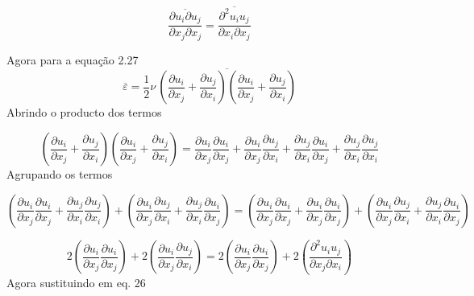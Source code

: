 \documentclass[12pt]{article}
\begin{document}
\begin{equation}
	\frac{\overline{\partial u_i \partial u_j}}{\partial x_j \partial x_j} = \frac{\overline{\partial ^2 u_i u_j}}{\partial x_i \partial x_j}
\end{equation}


Agora para a equação 2.27 
\begin{equation}
	\overline{\varepsilon} = \frac{1}{2} \nu \, \overline{
		\left( \frac{\partial u_i}{\partial x_j} + \frac{\partial u_j}{\partial x_i} \right)
		\left( \frac{\partial u_i}{\partial x_j} + \frac{\partial u_j}{\partial x_i} \right)
	}
\end{equation}
Abrindo o producto dos termos

\begin{equation}
	\left( \frac{\partial u_i}{\partial x_j} + \frac{\partial u_j}{\partial x_i} \right)
	\left( \frac{\partial u_i}{\partial x_j} + \frac{\partial u_j}{\partial x_i} \right) = \frac{\partial u_i}{\partial x_j}\frac{\partial u_i}{\partial x_j} + \frac{\partial u_i}{\partial x_j}\frac{\partial u_j}{\partial x_i} + \frac{\partial u_j}{\partial x_i}\frac{\partial u_i}{\partial x_j} + \frac{\partial u_j}{\partial x_i}\frac{\partial u_j}{\partial x_i}
\end{equation}
 Agrupando os termos
 
\begin{equation}
	 \left( \frac{\partial u_i}{\partial x_j}\frac{\partial u_i}{\partial x_j} +  \frac{\partial u_j}{\partial x_i}\frac{\partial u_j}{\partial x_i} \right) + \left(  \frac{\partial u_i}{\partial x_j}\frac{\partial u_j}{\partial x_i} + \frac{\partial u_j}{\partial x_i}\frac{\partial u_i}{\partial x_j} \right) = 
	 \left( \frac{\partial u_i}{\partial x_j}\frac{\partial u_i}{\partial x_j} +  \frac{\partial u_i}{\partial x_j}\frac{\partial u_i}{\partial x_j} \right) + \left(  \frac{\partial u_i}{\partial x_j}\frac{\partial u_j}{\partial x_i} + \frac{\partial u_j}{\partial x_i}\frac{\partial u_i}{\partial x_j} \right)
\end{equation}

\begin{equation}
	2\left( \frac{\partial u_i}{\partial x_j}\frac{\partial u_i}{\partial x_j}  \right) + 2\left(  \frac{\partial u_i}{\partial x_j}\frac{\partial u_j}{\partial x_i} \right) = 2\left( \frac{\partial u_i}{\partial x_j}\frac{\partial u_i}{\partial x_j}  \right) + 2\left(  \frac{\partial ^2 u_i u_j}{\partial x_j \partial x_i} \right)
\end{equation}
Agora sustituindo em eq. 26
\end{document}
